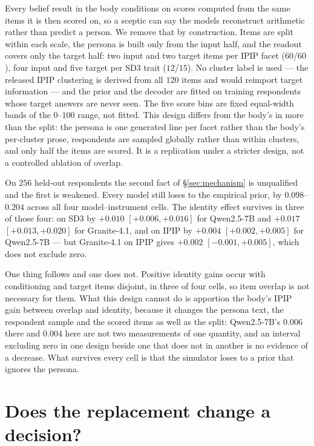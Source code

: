 \documentclass[11pt]{article}
\begin{document}
Every belief result in the body conditions on scores computed from the same
items it is then scored on, so a sceptic can say the models reconstruct
arithmetic rather than predict a person. We remove that by construction. Items
are split within each scale, the persona is built only from the input half, and
the readout covers only the target half: two input and two target items per IPIP
facet ($60$/$60$), four input and five target per SD3 trait ($12$/$15$). No
cluster label is used --- the released IPIP clustering is derived from all $120$
items and would reimport target information --- and the prior and the decoder are fitted on training
respondents whose target answers are never seen. The five score bins are fixed
equal-width bands of the $0$--$100$ range, not fitted. This design differs from the
body's in more than the split: the persona is one generated line per facet
rather than the body's per-cluster prose, respondents are sampled globally
rather than within clusters, and only half the items are scored. It is a
replication under a stricter design, not a controlled ablation of overlap.

On $256$ held-out respondents the second fact of \S\ref{sec:mechanism} is
unqualified and the first is weakened. Every model still loses to the empirical
prior, by $0.098$--$0.204$ across all four model--instrument cells. The identity
effect survives in three of those four: on SD3 by $+0.010$ $[+0.006,+0.016]$ for
Qwen2.5-7B and $+0.017$ $[+0.013,+0.020]$ for Granite-4.1, and on IPIP by
$+0.004$ $[+0.002,+0.005]$ for Qwen2.5-7B --- but Granite-4.1 on IPIP gives
$+0.002$ $[-0.001,+0.005]$, which does not exclude zero.

One thing follows and one does not. Positive identity gains occur with
conditioning and target items disjoint, in three of four cells, so item overlap
is not necessary for them. What this design cannot do is apportion the body's
IPIP gain between overlap and identity, because it changes the persona text, the
respondent sample and the scored items as well as the split: Qwen2.5-7B's
$0.006$ there and $0.004$ here are not two measurements of one quantity, and an
interval excluding zero in one design beside one that does not in another is no
evidence of a decrease. What survives every cell is that the simulator loses to
a prior that ignores the persona.

\section{Does the replacement change a decision?}
\label{app:selection}
\end{document}
